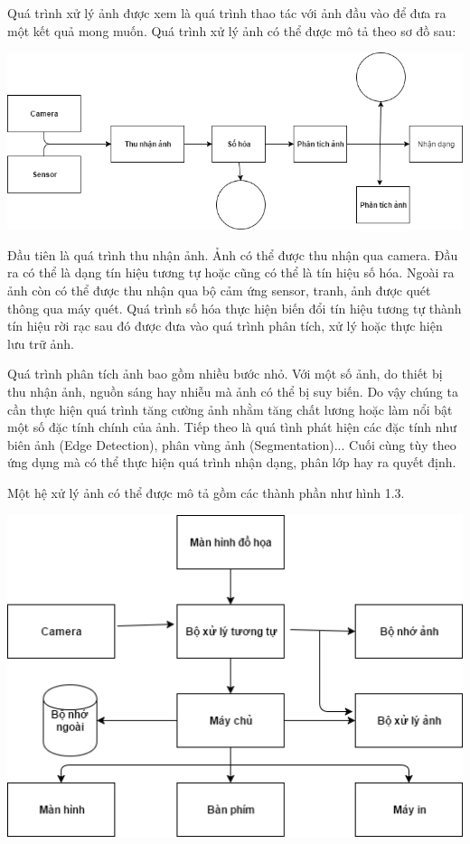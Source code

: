 \documentclass[12pt, oneside, a4paper]{book}
\begin{document}
Quá trình xử lý ảnh được xem là quá trình thao tác với ảnh đầu vào để đưa ra một kết quả mong muốn. Quá trình xử lý ảnh có thể được mô tả theo sơ đồ sau:
\begin{center}
\includegraphics[scale=0.5]{figure/quatrinh.png}
\end{center}
Đầu tiên là quá trình thu nhận ảnh. Ảnh có thể được thu nhận qua camera. Đầu ra có thể là dạng tín hiệu tương tự hoặc cũng có thể là tín hiệu số hóa. Ngoài ra ảnh còn có thể được thu nhận qua bộ cảm ứng sensor, tranh, ảnh được quét thông qua máy quét.
Quá trình số hóa thực hiện biến đổi tín hiệu tương tự thành tín hiệu rời rạc sau đó được đưa vào quá trình phân tích, xử lý hoặc thực hiện lưu trữ ảnh.

Quá trình phân tích ảnh bao gồm nhiều bước nhỏ. Với một số ảnh, do thiết bị thu nhận ảnh, nguồn sáng hay nhiễu mà ảnh có thể bị suy biến. Do vậy chúng ta cần thực hiện quá trình tăng cường ảnh nhằm tăng chất lương hoặc làm nổi bật một số đặc tính chính của ảnh. Tiếp theo là quá tình phát hiện các đặc tính như biên ảnh (Edge Detection), phân vùng ảnh (Segmentation)...
Cuối cùng tùy theo ứng dụng mà có thể thực hiện quá trình nhận dạng, phân lớp hay ra quyết định.
 
Một hệ xử lý ảnh có thể được mô tả gồm các thành phần như hình 1.3.
\begin{center}
\includegraphics[scale=0.7]{figure/hethong.png}
\end{center}
\end{document}
